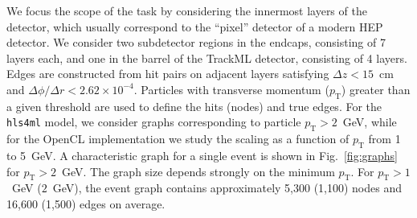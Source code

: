 \documentclass{article}
\newcommand{\TODO}[1]{\textcolor{red}{TODO: #1}}
\newcommand{\hlsfml}{\texttt{hls4ml}\xspace}
\newcommand{\pt}{\ensuremath{p_{\mathrm{T}}}\xspace}
\begin{document}
We focus the scope of the task by considering the innermost layers of the detector, which usually correspond to the ``pixel'' detector of a modern HEP detector. 
We consider two subdetector regions in the endcaps, consisting of 7 layers each, and one in the barrel of the TrackML detector, consisting of 4 layers.
Edges are constructed from hit pairs on adjacent layers satisfying $\Delta z < 15$~cm and $\Delta\phi / \Delta r < 2.62\times 10^{-4}$.
Particles with transverse momentum ($\pt$) greater than a given threshold are used to define the hits (nodes) and true edges.
For the \hlsfml model, we consider graphs corresponding to particle $\pt>2$~GeV, while for the OpenCL implementation we study the scaling as a function of $\pt$ from 1 to 5~GeV. 
A characteristic graph for a single event is shown in Fig.~\ref{fig:graphs} for $\pt>2$~GeV.
The graph size depends strongly on the minimum $\pt$.
For $\pt > 1$~GeV ($2$~GeV), the event graph contains approximately 5,300 (1,100) nodes and 16,600 (1,500) edges on average.
\end{document}
